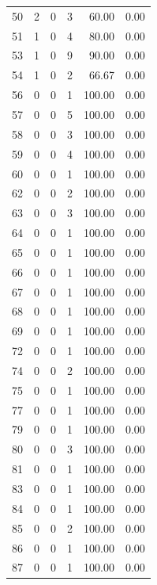 \documentclass[11pt]{article}
\begin{document}
\begin{longtable}{r|r|r|r|r|r}
    50    & 2     & 0     & 3     & 60.00 & 0.00\\
    51    & 1     & 0     & 4     & 80.00 & 0.00\\
    53    & 1     & 0     & 9     & 90.00 & 0.00\\
    54    & 1     & 0     & 2     & 66.67 & 0.00\\
    56    & 0     & 0     & 1     & 100.00 & 0.00 \\
    57    & 0     & 0     & 5     & 100.00 & 0.00 \\
    58    & 0     & 0     & 3     & 100.00 & 0.00 \\
    59    & 0     & 0     & 4     & 100.00 & 0.00 \\
    60    & 0     & 0     & 1     & 100.00 & 0.00 \\
    62    & 0     & 0     & 2     & 100.00 & 0.00 \\
    63    & 0     & 0     & 3     & 100.00 & 0.00 \\
    64    & 0     & 0     & 1     & 100.00 & 0.00 \\
    65    & 0     & 0     & 1     & 100.00 & 0.00 \\
    66    & 0     & 0     & 1     & 100.00 & 0.00 \\
    67    & 0     & 0     & 1     & 100.00 & 0.00 \\
    68    & 0     & 0     & 1     & 100.00 & 0.00 \\
    69    & 0     & 0     & 1     & 100.00 & 0.00 \\
    72    & 0     & 0     & 1     & 100.00 & 0.00 \\
    74    & 0     & 0     & 2     & 100.00 & 0.00 \\
    75    & 0     & 0     & 1     & 100.00 & 0.00 \\
    77    & 0     & 0     & 1     & 100.00 & 0.00 \\
    79    & 0     & 0     & 1     & 100.00 & 0.00 \\
    80    & 0     & 0     & 3     & 100.00 & 0.00 \\
    81    & 0     & 0     & 1     & 100.00 & 0.00 \\
    83    & 0     & 0     & 1     & 100.00 & 0.00 \\
    84    & 0     & 0     & 1     & 100.00 & 0.00 \\
    85    & 0     & 0     & 2     & 100.00 & 0.00 \\
    86    & 0     & 0     & 1     & 100.00 & 0.00 \\
    87    & 0     & 0     & 1     & 100.00 & 0.00 \\

\end{longtable}
\end{document}
